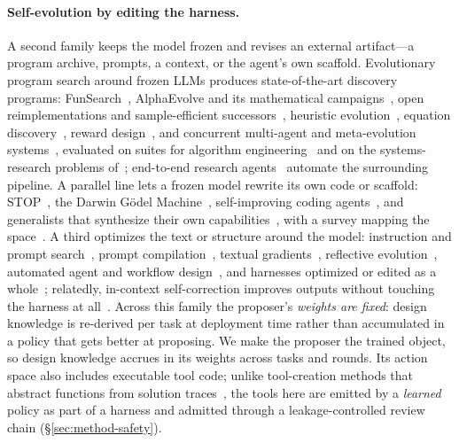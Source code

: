 \paragraph{Self-evolution by editing the harness.}  A second family keeps the
model frozen and revises an external artifact---a program archive, prompts, a
context, or the agent's own scaffold.  Evolutionary program search around frozen
LLMs produces state-of-the-art discovery programs: FunSearch~\citep{funsearch},
AlphaEvolve and its mathematical campaigns~\citep{alphaevolve,alphaevolvemath},
open reimplementations and sample-efficient
successors~\citep{openevolve,shinkaevolve}, heuristic evolution~\citep{eoh},
equation discovery~\citep{llmsr}, reward design~\citep{eureka}, and concurrent
multi-agent and meta-evolution systems~\citep{qu2026coral,liu2026evox},
evaluated on suites for algorithm engineering~\citep{alebench} and on the
systems-research problems of~\citet{barbarians}; end-to-end research
agents~\citep{aiscientist} automate the surrounding pipeline.  A parallel line
lets a frozen model rewrite its own code or scaffold: STOP~\citep{stop}, the
Darwin G\"odel Machine~\citep{dgm}, self-improving coding
agents~\citep{sica,godelagent}, and generalists that synthesize their own
capabilities~\citep{alita}, with a survey mapping the
space~\citep{selfevolvesurvey}.  A third optimizes the text or structure around
the model: instruction and prompt
search~\citep{ape,opro,promptbreeder,evoprompt,metaprompting}, prompt
compilation~\citep{dspy,mipro}, textual gradients~\citep{textgrad,trace},
reflective evolution~\citep{gepa}, automated agent and workflow
design~\citep{adas,aflow,agentsquare,agentsymbolic}, and harnesses optimized or
edited as a whole~\citep{metaharness,selfharness}; relatedly, in-context
self-correction improves outputs without touching the harness at
all~\citep{voyager,reflexion,selfrefine}.  Across this family the proposer's
\emph{weights are fixed}: design knowledge is re-derived per task at deployment
time rather than accumulated in a policy that gets better at proposing.  We make
the proposer the trained object, so design knowledge accrues in its weights
across tasks and rounds.  Its action space also includes executable tool code;
unlike tool-creation methods that abstract functions from solution
traces~\citep{latm,creator,craft,trove}, the tools here are emitted by a
\emph{learned} policy as part of a harness and admitted through a
leakage-controlled review chain (\S\ref{sec:method-safety}).
